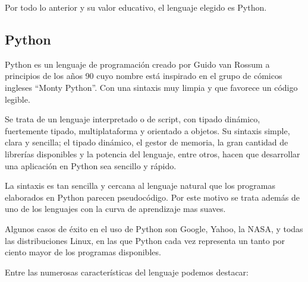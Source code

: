  Por todo lo anterior y su valor educativo, el lenguaje elegido es Python. 
 
 
 \subsection{Python}
 
  Python es un lenguaje de programación creado por Guido van Rossum a principios de los años 90 cuyo nombre está inspirado en el grupo de  cómicos ingleses “Monty Python”. Con una sintaxis muy limpia y que favorece un código legible.
  
  Se trata de un lenguaje interpretado o de script, con tipado dinámico, fuertemente tipado, multiplataforma y orientado a objetos. Su sintaxis simple, clara y sencilla; el tipado dinámico, el gestor de memoria, la gran cantidad de librerías disponibles y la potencia del lenguaje, entre otros, hacen que desarrollar una aplicación en Python sea sencillo y rápido.
  
  La sintaxis es tan sencilla y cercana al lenguaje natural que los programas elaborados en Python parecen pseudocódigo. Por este motivo se trata además de uno de los lenguajes con la curva de aprendizaje mas suaves.
  
  
  Algunos casos de éxito en el uso de Python son Google, Yahoo, la NASA,  y todas las distribuciones Linux, en las que Python cada vez representa un tanto por ciento mayor de los programas disponibles.  
 
 Entre las numerosas características del lenguaje podemos destacar:
 
